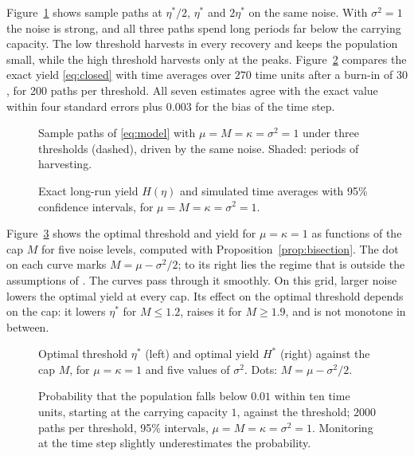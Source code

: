 \documentclass[11pt]{article}
\theoremstyle{definition}
\begin{document}
Figure~\ref{fig:paths} shows sample paths at $\eta^*/2$, $\eta^*$ and $2\eta^*$ on the same noise. With $\sigma^2 = 1$ the noise is strong, and all
three paths spend long periods far below the carrying capacity. The low threshold harvests in every recovery
and keeps the population small, while the high threshold harvests only at the peaks. Figure~\ref{fig:yield}
compares the exact yield \eqref{eq:closed} with time averages over $270$ time units after a burn-in of $30$,
for 200 paths per threshold. All seven estimates agree with the exact value within four standard errors plus
$0.003$ for the bias of the time step.

\begin{figure}[t]
\centering

\caption{Sample paths of \eqref{eq:model} with $\mu = M = \kappa = \sigma^2 = 1$ under three thresholds (dashed),
driven by the same noise. Shaded: periods of harvesting.}
\label{fig:paths}
\end{figure}

\begin{figure}[t]
\centering

\caption{Exact long-run yield $H(\eta)$ and simulated time averages with 95\% confidence intervals, for
$\mu = M = \kappa = \sigma^2 = 1$.}
\label{fig:yield}
\end{figure}

Figure~\ref{fig:sens} shows the optimal threshold and yield for $\mu = \kappa = 1$ as functions of the cap $M$ for
five noise levels, computed with Proposition~\ref{prop:bisection}. The dot on each curve marks $M = \mu -
\sigma^2/2$; to its right lies the regime that is outside the assumptions of \cite[Lemma~5.4]{ekstrom26}. The
curves pass through it smoothly. On this grid, larger noise lowers the optimal yield at every cap. Its effect on the
optimal threshold depends on the cap: it lowers $\eta^*$ for $M \le 1.2$, raises it for $M \ge 1.9$, and is not
monotone in between.

\begin{figure}[t]
\centering

\caption{Optimal threshold $\eta^*$ (left) and optimal yield $H^*$ (right) against the cap $M$, for $\mu = \kappa = 1$
and five values of $\sigma^2$. Dots: $M = \mu - \sigma^2/2$.}
\label{fig:sens}
\end{figure}

\begin{figure}[t]
\centering

\caption{Probability that the population falls below $0.01$ within ten time units, starting at the carrying
capacity $1$, against the threshold; $2000$ paths per threshold, 95\% intervals, $\mu = M = \kappa = \sigma^2 = 1$.
Monitoring at the time step slightly underestimates the probability.}
\label{fig:risk}
\end{figure}
\end{document}
